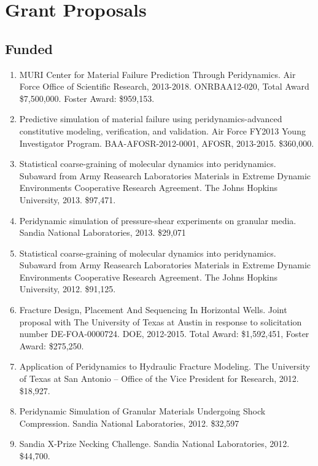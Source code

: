 \section*{Grant Proposals}

\subsection*{Funded}

\begin{enumerate}
    \item MURI Center for Material Failure Prediction Through Peridynamics. Air Force Office of Scientific Research, 2013-2018. ONRBAA12-020, Total Award \$7,500,000.  Foster Award: \$959,153.
    \item Predictive simulation of material failure using peridynamics-advanced constitutive modeling, verification, and validation. Air Force FY2013 Young Investigator Program. BAA-AFOSR-2012-0001, AFOSR, 2013-2015.  \$360,000.
    \item Statistical coarse-graining of molecular dynamics into peridynamics. Subaward from Army Reasearch Laboratories Materials in Extreme Dynamic Environments Cooperative Research Agreement.  The Johns Hopkins University, 2013.  \$97,471.
    \item Peridynamic simulation of pressure-shear experiments on granular media.  Sandia National Laboratories, 2013. \$29,071
    \item Statistical coarse-graining of molecular dynamics into peridynamics. Subaward from Army Reasearch Laboratories Materials in Extreme Dynamic Environments Cooperative Research Agreement.  The Johns Hopkins University, 2012.  \$91,125.
    \item Fracture Design, Placement And Sequencing In Horizontal Wells. Joint proposal with The University of Texas at Austin in response to solicitation number DE-FOA-0000724.  DOE, 2012-2015. Total Award: \$1,592,451, Foster Award: \$275,250.
    \item Application of Peridynamics to Hydraulic Fracture Modeling. The University of Texas at San Antonio -- Office of the Vice President for Research, 2012. \$18,927.
    \item Peridynamic Simulation of Granular Materials Undergoing Shock Compression.  Sandia National Laboratories, 2012. \$32,597
    \item Sandia X-Prize Necking Challenge.  Sandia National Laboratories, 2012. \$44,700.
\end{enumerate}


